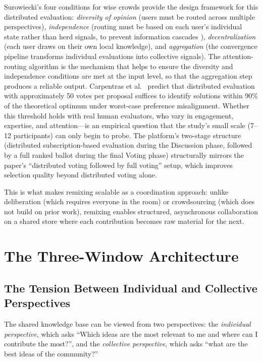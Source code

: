 \documentclass[a4paper, 12pt, twoside]{iviathesis}
\begin{document}
Surowiecki's four conditions for wise crowds \cite{surowiecki2004} provide the design framework for this distributed evaluation: \textit{diversity of opinion} (users must be routed across multiple perspectives), \textit{independence} (routing must be based on each user's individual state rather than herd signals, to prevent information cascades \cite{lorenz2011social}), \textit{decentralization} (each user draws on their own local knowledge), and \textit{aggregation} (the convergence pipeline transforms individual evaluations into collective signals). The attention-routing algorithm is the mechanism that helps to ensure the diversity and independence conditions are met at the input level, so that the aggregation step produces a reliable output. Carpentras et al.\ \cite{carpentras_wisdom_2025} predict that distributed evaluation with approximately 50 votes per proposal suffices to identify solutions within 90\% of the theoretical optimum under worst-case preference misalignment. Whether this threshold holds with real human evaluators, who vary in engagement, expertise, and attention---is an empirical question that the study's small scale (7--12 participants) can only begin to probe. The platform's two-stage structure (distributed subscription-based evaluation during the Discussion phase, followed by a full ranked ballot during the final Voting phase) structurally mirrors the paper's ``distributed voting followed by full voting'' setup, which improves selection quality beyond distributed voting alone.

This is what makes remixing scalable as a coordination approach: unlike deliberation (which requires everyone in the room) or crowdsourcing (which does not build on prior work), remixing enables structured, asynchronous collaboration on a shared store where each contribution becomes raw material for the next.

\section{The Three-Window Architecture}
\label{sec:three-window}

\subsection{The Tension Between Individual and Collective Perspectives}

The shared knowledge base can be viewed from two perspectives: the \textit{individual perspective}, which asks ``Which ideas are the most relevant to me and where can I contribute the most?'', and the \textit{collective perspective}, which asks ``what are the best ideas of the community?''
\end{document}
